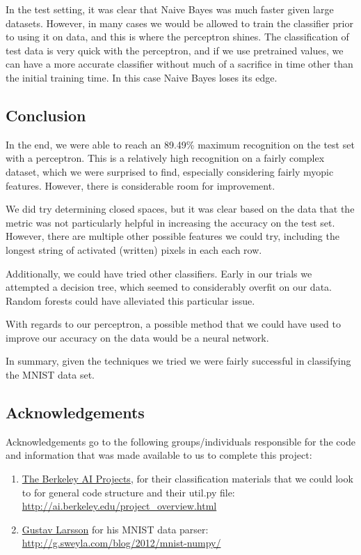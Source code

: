 \documentclass{article}
\theoremstyle{remark}
\begin{document}
     In the test setting, it was clear that Naive Bayes was much faster given large datasets. However, in many cases we would be allowed to train the classifier prior to using it on data, and this is where the perceptron shines. The classification of test data is very quick with the perceptron, and if we use pretrained values, we can have a more accurate classifier without much of a sacrifice in time other than the initial training time. In this case Naive Bayes loses its edge.
     \subsection*{Conclusion}
     In the end, we were able to reach an 89.49\% maximum recognition on the test set with a perceptron. This is a relatively high recognition on a fairly complex dataset, which we were surprised to find, especially considering fairly myopic features. However, there is considerable room for improvement.

     We did try determining closed spaces, but it was clear based on the data that the metric was not particularly helpful in increasing the accuracy on the test set. However, there are multiple other possible features we could try, including the longest string of activated (written) pixels in each each row.

     Additionally, we could have tried other classifiers. Early in our trials we attempted a decision tree, which seemed to considerably overfit on our data. Random forests could have alleviated this particular issue.

     With regards to our perceptron, a possible method that we could have used to improve our accuracy on the data would be a neural network.

     In summary, given the techniques we tried we were fairly successful in classifying the MNIST data set.


     \subsection*{Acknowledgements}

     Acknowledgements go to the following groups/individuals responsible for the code and information that was made available to us to complete this project:

     \begin{enumerate}
      \item \href{http://ai.berkeley.edu/project_overview.html}{The Berkeley AI Projects}, for their classification materials that we could look to for general code structure and their util.py file: \\
      \url{http://ai.berkeley.edu/project_overview.html}
      \item \href{http://g.sweyla.com/blog/2012/mnist-numpy/}{Gustav Larsson} for his MNIST data parser: \\
      \url{http://g.sweyla.com/blog/2012/mnist-numpy/}
     \end{enumerate}







    
\end{document}
